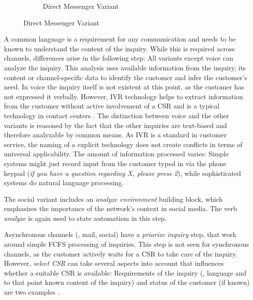 \begin{figure}[caption={Route Inquiry Detail Process}, label={fig:inbound:route}]
\begin{subfigure}[b]{.45\textwidth}
\begin{tikzpicture}
	 		\end{tikzpicture}
	 		\caption{Direct Messenger Variant}\label{fig:inbound:route:dm}
	 	\end{subfigure}
	 \end{figure}
	 
	 A common language is a requirement for any communication and needs to be known to understand the content of the inquiry. While this is required across channels, differences arise in the following step: All variants except voice can analyze the inquiry. This analysis uses available information from the inquiry, \ie its content or channel-specific data to identify the customer and infer the customer's need. In voice the inquiry itself is not existent at this point, as the customer has not expressed it verbally. However, \acrfull{IVR} technology helps to extract information from the customer without active involvement of a \acrshort{CSR} and is a typical technology in contact centers \citep{Thomas:2009}. The distinction between voice and the other variants is reasoned by the fact that the other inquiries are text-based and therefore analyzable by common means. As \acrshort{IVR} is a standard in customer service, the naming of a explicit technology does not create conflicts in terms of universal applicability. The amount of information processed varies: Simple systems might just record input from the customer typed in via the phone keypad (\textit{if you have  a question regarding X, please press 2}), while sophisticated systems do natural language processing.
	 
	 The social variant includes an \textit{analyze environment} building block, which emphasizes the importance of the network's context in social media. The verb \textit{analyze} is again used to state automatism in this step. 
	 
	 Asynchronous channels (\ie, mail, social) have a \textit{priorize inquiry} step, that work around simple \acrfull{FCFS} processing of inquiries. This step is not seen for synchronous channels, as the customer actively waits for a \acrshort{CSR} to take care of the inquiry. However, \textit{select \acrshort{CSR}} can take several aspects into account that influences whether a suitable \acrshort{CSR} is available:
	 Requirements of the inquiry (\ie, language and to that point known content of the inquiry) and status of the customer (if known) are two examples . 
	 
